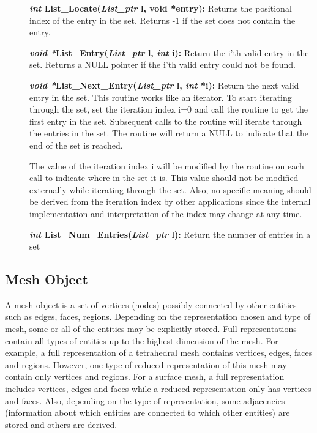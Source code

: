 \documentclass[12pt]{article}
\begin{document}
\begin{description}
\item[]\textbf{\textit{int} List\_Locate(\textit{List\_ptr} l, void *entry):}
Returns the positional index of the entry in the set. Returns -1 if
the set does not contain the entry.

\item[]\textbf{\textit{void *}List\_Entry(\textit{List\_ptr} l, \textit{int}
i):} Return the i'th valid entry in the set.  Returns a NULL pointer if
the i'th valid entry could not be found.

\item[]\textbf{\textit{void *}List\_Next\_Entry(\textit{List\_ptr} l,
\textit{int} *i):} Return the next valid entry in the set. This routine
works like an iterator. To start iterating through the set, set the
iteration index i=0 and call the routine to get the first entry in the
set. Subsequent calls to the routine will iterate through the entries
in the set. The routine will return a NULL to indicate that the end of
the set is reached.

The value of the iteration index i will be modified by the routine on
each call to indicate where in the set it is. This value should not be
modified externally while iterating through the set. Also, no specific
meaning should be derived from the iteration index by other applications
since the internal implementation and interpretation of the index may
change at any time.

\item[]\textbf{\textit{int} List\_Num\_Entries(\textit{List\_ptr} l):} Return
the number of entries in a set
\end{description}

\newpage
\subsection{Mesh Object}

A mesh object is a set of vertices (nodes) possibly connected by other
entities such as edges, faces, regions. Depending on the
representation chosen and type of mesh, some or all of the entities
may be explicitly stored.  Full representations contain all types of
entities up to the highest dimension of the mesh. For example, a full
representation of a tetrahedral mesh contains vertices, edges, faces
and regions. However, one type of reduced representation of this mesh
may contain only vertices and regions. For a surface mesh, a full
representation includes vertices, edges and faces while a reduced
representation only has vertices and faces. Also, depending on the
type of representation, some adjacencies (information about which
entities are connected to which other entities) are stored and others
are derived.
\end{document}
